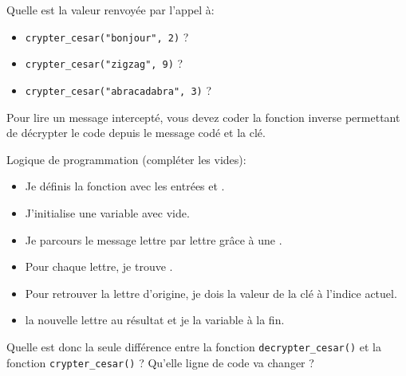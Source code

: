\begin{Exercise}[title={Analyse du protocole de César}]
\Question Quelle est la valeur renvoyée par l'appel à:
\begin{itemize}
    \item \texttt{crypter\_cesar("bonjour", 2)} ? \dotfill
    \item \texttt{crypter\_cesar("zigzag", 9)} ? \dotfill
    \item \texttt{crypter\_cesar("abracadabra", 3)} ? \dotfill
\end{itemize}
\end{Exercise}


\begin{Exercise}[title={Mission : Créer le protocole de décryptage}]

Pour lire un message intercepté, vous devez coder la fonction inverse permettant de décrypter le code depuis le message codé et la clé.

\Question Logique de programmation (compléter les vides):
\begin{itemize}
    \item Je définis la fonction \dotfill avec les entrées \dotfill et \dotfill.
    \item J'initialise une variable \dotfill avec \dotfill vide.
    \item Je parcours le message lettre par lettre grâce à une \dotfill.
    \item Pour chaque lettre, je trouve \dotfill.
    \item Pour retrouver la lettre d'origine, je dois \dotfill la valeur de la clé à l'indice actuel.
    \item \dotfill la nouvelle lettre au résultat et je \dotfill la variable \dotfill à la fin.
\end{itemize}

\Question Quelle est donc la seule différence entre la fonction \texttt{decrypter\_cesar()} et la fonction \texttt{crypter\_cesar()} ? Qu'elle ligne de code va changer ?\\
\emptybox{2cm}
\end{Exercise}

